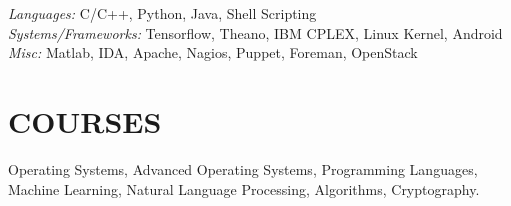 \documentclass[overlapped,9pt]{res}
\begin{document}
\begin{resume}
  \vspace{-20pt}
  {\sl Languages:} C/C++, Python, Java, Shell Scripting\\

  \vspace{-20pt}
  {\sl Systems/Frameworks:} Tensorflow, Theano, IBM CPLEX, Linux Kernel,
    Android\\

  \vspace{-20pt}
  {\sl Misc:} Matlab, IDA, Apache, Nagios, Puppet, Foreman, OpenStack


\section{COURSES} Operating Systems, Advanced Operating Systems,
    Programming Languages, Machine Learning, Natural Language Processing,
    Algorithms, Cryptography.


\end{resume}
\end{document}
